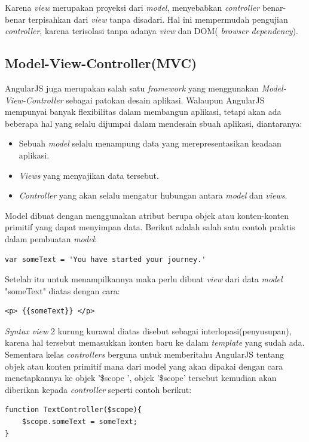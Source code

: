 	Karena \textit{view} merupakan proyeksi dari \textit{model}, menyebabkan \textit{controller} benar-benar terpisahkan dari \textit{view} tanpa disadari. Hal ini mempermudah pengujian \textit{controller}, karena terisolasi tanpa adanya \textit{view} dan DOM( \textit{browser dependency}).
	
\subsection{Model-View-Controller(MVC)}
\label{sub: mvcAngular}

	AngularJS\cite{green2013angularjs} juga merupakan salah satu \textit{framework} yang menggunakan  \textit{Model-View-Controller} sebagai patokan desain aplikasi. Walaupun AngularJS mempunyai banyak flexibilitas dalam membangun aplikasi, tetapi akan ada beberapa hal yang selalu dijumpai dalam mendesain sbuah aplikasi, diantaranya:
	\begin{itemize}
		\item Sebuah \textit{model} selalu menampung data yang merepresentasikan keadaan aplikasi.
		\item \textit{Views} yang menyajikan data tersebut.
		\item \textit{Controller} yang akan selalu mengatur hubungan antara \textit{model} dan \textit{views}.
	\end{itemize}
	
	Model dibuat dengan menggunakan atribut berupa objek atau konten-konten primitif yang dapat menyimpan data. Berikut adalah salah satu contoh praktis dalam pembuatan \textit{model}:
\begin{lstlisting}
var someText = 'You have started your journey.'
\end{lstlisting}
	Setelah itu untuk menampilkannya maka perlu dibuat \textit{view} dari data \textit{model} "someText" diatas dengan cara:
\begin{lstlisting}
<p> {{someText}} </p>
\end{lstlisting}
	\textit{Syntax view} 2 kurung kurawal diatas disebut sebagai interlopasi(penyusupan), karena hal tersebut memasukkan konten baru ke dalam \textit{template} yang sudah ada.\\
	Sementara kelas \textit{controllers} berguna untuk memberitahu AngularJS tentang objek atau konten primitif mana dari model yang akan dipakai dengan cara menetapkannya ke objek '\$scope ', objek '\$scope' tersebut kemudian akan diberikan kepada \textit{controller} seperti contoh berikut:
\begin{lstlisting}
function TextController($scope){
	$scope.someText = someText;
}
\end{lstlisting}
	
